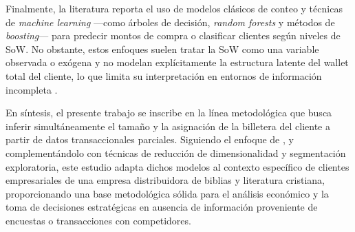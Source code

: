 Finalmente, la literatura reporta el uso de modelos clásicos de conteo y técnicas de \emph{machine learning} —como árboles de decisión, \emph{random forests} y métodos de \emph{boosting}— para predecir montos de compra o clasificar clientes según niveles de SoW. No obstante, estos enfoques suelen tratar la SoW como una variable observada o exógena y no modelan explícitamente la estructura latente del wallet total del cliente, lo que limita su interpretación en entornos de información incompleta \cite{glady2009predicting}.

En síntesis, el presente trabajo se inscribe en la línea metodológica que busca inferir simultáneamente el tamaño y la asignación de la billetera del cliente a partir de datos transaccionales parciales. Siguiendo el enfoque de \cite{glady2009predicting}, y complementándolo con técnicas de reducción de dimensionalidad y segmentación exploratoria, este estudio adapta dichos modelos al contexto específico de clientes empresariales de una empresa distribuidora de biblias y literatura cristiana, proporcionando una base metodológica sólida para el análisis económico y la toma de decisiones estratégicas en ausencia de información proveniente de encuestas o transacciones con competidores.
